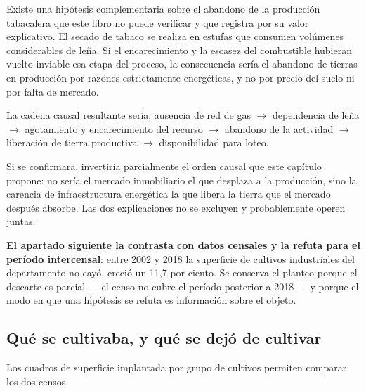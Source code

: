 \begin{cautela}
Existe una hipótesis complementaria sobre el abandono de la producción tabacalera que este libro no puede verificar y que registra por su valor explicativo. El secado de tabaco se realiza en estufas que consumen volúmenes considerables de leña. Si el encarecimiento y la escasez del combustible hubieran vuelto inviable esa etapa del proceso, la consecuencia sería el abandono de tierras en producción por razones estrictamente energéticas, y no por precio del suelo ni por falta de mercado.

La cadena causal resultante sería: ausencia de red de gas $\rightarrow$ dependencia de leña $\rightarrow$ agotamiento y encarecimiento del recurso $\rightarrow$ abandono de la actividad $\rightarrow$ liberación de tierra productiva $\rightarrow$ disponibilidad para loteo.

Si se confirmara, invertiría parcialmente el orden causal que este capítulo propone: no sería el mercado inmobiliario el que desplaza a la producción, sino la carencia de infraestructura energética la que libera la tierra que el mercado después absorbe. Las dos explicaciones no se excluyen y probablemente operen juntas.

\textbf{El apartado siguiente la contrasta con datos censales y la refuta para el período intercensal}: entre 2002 y 2018 la superficie de cultivos industriales del departamento no cayó, creció un 11,7 por ciento. Se conserva el planteo porque el descarte es parcial --- el censo no cubre el período posterior a 2018 --- y porque el modo en que una hipótesis se refuta es información sobre el objeto.
\end{cautela}

\subsection*{Qué se cultivaba, y qué se dejó de cultivar}

Los cuadros de superficie implantada por grupo de cultivos permiten comparar los dos censos.

